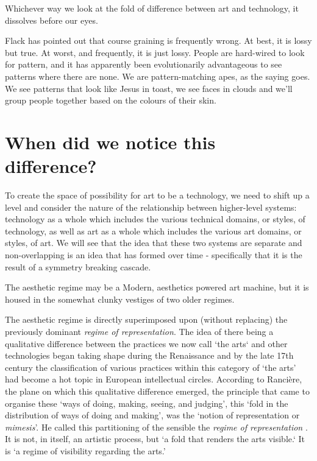 \documentclass[letterpaper]{article}
\begin{document}
    Whichever way we look at the fold of difference between art and technology, it dissolves before our eyes.
    
    Flack has pointed out that course graining is frequently wrong. At best, it is lossy but true. At worst, and frequently, it is just lossy. People are hard-wired to look for pattern, and it has apparently been evolutionarily advantageous to see patterns where there are none. We are pattern-matching apes, as the saying goes. We see patterns that look like Jesus in toast, we see faces in clouds and we'll group people together based on the colours of their skin.

\section{When did we notice this difference?}
    
    To create the space of possibility for art to be a technology, we need to shift up a level and consider the nature of the relationship between higher-level systems: technology as a whole which includes the various technical domains, or styles, of technology, as well as art as a whole which includes the various art domains, or styles, of art. We will see that the idea that these two systems are separate and non-overlapping is an idea that has formed over time - specifically that it is the result of a symmetry breaking cascade.

    The aesthetic regime may be a Modern, aesthetics powered art machine, but it is housed in the somewhat clunky vestiges of two older regimes. 
    
    The aesthetic regime is directly superimposed upon (without replacing) the previously dominant \emph{regime of representation}. The idea of there being a qualitative difference between the practices we now call ‘the arts‘ and other technologies began taking shape during the Renaissance \citep[p.136]{TatarkiewiczWhtIsArt1971} and by the late 17th century the classification of various practices within this category of ‘the arts’ had become a hot topic in European intellectual circles. According to Rancière, the plane on which this qualitative difference emerged, the principle that came to organise these ‘ways of doing, making, seeing, and judging’, this ‘fold in the distribution of ways of doing and making’, was the ‘notion of representation or \emph{mimesis}’. He called this partitioning of the sensible the \emph{regime of representation} \citep[p.22]{RancierPltcsOfThAsthtcs2004}. It is not, in itself, an artistic process, but ‘a fold that renders the arts visible.‘ It is  ‘a regime of visibility regarding the arts.’
    
\end{document}
